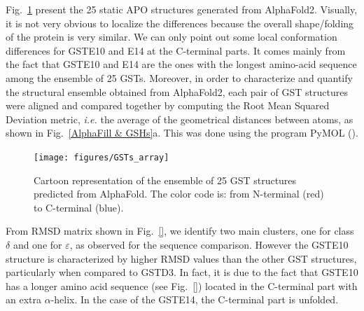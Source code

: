 Fig.~\ref{AlphaFold structures} present the 25 static APO structures generated from AlphaFold2. Visually, it is not very obvious to localize the differences because the overall shape/folding of the protein is very similar. We can only point out some local conformation differences for GSTE10 and E14 at the C-terminal parts. It comes mainly from the fact that GSTE10 and E14 are the ones with the longest amino-acid sequence among the ensemble of 25 GSTs. Moreover, in order to characterize and quantify the structural ensemble obtained from AlphaFold2, each pair of GST structures were aligned and compared together by computing the Root Mean Squared Deviation metric, \textit{i.e.} the average of the geometrical distances between atoms, as shown in Fig.~\ref{AlphaFill & GSHs}a. This was done using the program PyMOL ().

\begin{figure}[h!]
	\centering
	\label{AlphaFold structures}
 	\texttt{[image: figures/GSTs\_array]}
	\caption{Cartoon representation of the ensemble of 25 GST structures predicted from AlphaFold. The color code is: from N-terminal (red) to C-terminal (blue).}
\end{figure}

From RMSD matrix shown in Fig.~\ref{}, we identify two main clusters, one for class $\delta$ and one for $\varepsilon$, as observed for the sequence comparison. However the GSTE10 structure is characterized by higher RMSD values than the other GST structures, particularly when compared to GSTD3. In fact, it is due to the fact that GSTE10 has a longer amino acid sequence (see Fig.~\ref{}) located in the C-terminal part with an extra $\alpha$-helix. In the case of the GSTE14, the C-terminal part is unfolded.

